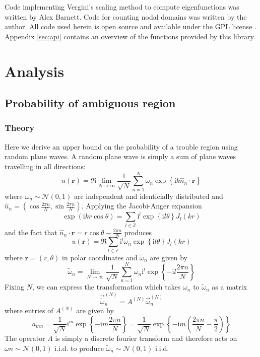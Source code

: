 \documentclass{report}
\newcommand{\rr}[0]{\mathbf{r}}
\begin{document}
Code implementing Vergini's scaling method to compute eigenfunctions was written by Alex Barnett. Code for counting nodal domains was written by the author. All code used herein is open source and available under the GPL license \cite{gpl} \cite{github}. Appendix \ref{sec:api} contains an overview of the functions provided by this library.

\section{Analysis}

\subsection{Probability of ambiguous region}

\subsubsection{Theory}
Here we derive an upper bound on the probability of a trouble region using random plane waves. A random plane wave is simply a sum of plane waves travelling in all directions:
\[
u(\rr) = \Re \lim_{N \rightarrow \infty} \frac{1}{\sqrt{N}} \sum_{n=1}^{N} \omega_{n} \exp{\left\{\mathrm{i} k \hat{n}_{n} \cdot \rr \right\}}
\]
where $\omega_{n} \sim \mathcal{N}(0,1)$ are independent and identicially distributed and $\hat{n}_{n} = (\cos \frac {2 \pi n}{N}, \sin \frac {2 \pi n}{N})$. Applying the Jacobi-Anger expansion
\[
\exp(\mathrm{i} k r \cos \theta) = \sum_{l \in \mathbb{Z}} \mathrm{i}^{l} \exp{\left\{\mathrm{i} l \theta \right\}} J_{l}(kr)
\]
and the fact that $\hat{n}_{n} \cdot \rr = r \cos{\theta - \frac{2 \pi n}{N}}$ produces
\begin{equation}
  \label{eq:rpw_bessel_expansion}
  u(\rr) = \Re \sum_{l \in \mathbb{Z}} \mathrm{i}^{l} \tilde{\omega}_{n} \exp{\left\{\mathrm{i} l \theta \right\}} J_{l}(kr)
\end{equation}
where $\rr = (r, \theta)$ in polar coordinates and $\tilde{\omega}_{n}$ are given by
\[
\tilde{\omega}_{n} = \lim_{N \rightarrow \infty} \frac{1}{\sqrt{N}} \sum_{n=1}^{N} \omega_{n} \mathrm{i}^{l} \exp{\left\{-\mathrm{i} l \frac{2 \pi n}{N} \right\}}
\]
Fixing $N$, we can express the transformation which takes $\omega_n$ to $\tilde{\omega}_n$ as a matrix
\[
\overrightarrow{\tilde{\omega}}_{n}^{(N)} = A^{(N)} \overrightarrow{\omega}_{n}^{(N)}
\]
where entries of $A^{(N)}$ are given by
\[
a_{mn} = \frac{1}{\sqrt{N}} \mathrm{i}^{m} \exp{\left\{-\mathrm{i} m \frac{2 \pi n}{N} \right\}} = \frac{1}{\sqrt{N}} \exp{\left\{-\mathrm{i} m \left(\frac{2 \pi n}{N} - \frac{\pi}{2}\right) \right\}} 
\]
The operator $A$ is simply a discrete fourier transform and therefore acts on $\omega{n} \sim \mathcal{N}(0,1)$ i.i.d. to produce $\tilde{\omega}_{n} \sim \mathcal{N}(0, 1)$ i.i.d.
\end{document}
